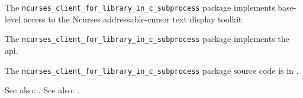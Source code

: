 
The {\tt ncurses\_client\_for\_library\_in\_c\_subprocess} package implements base-level access to the Ncurses addressable-cursor
text display toolkit.

The {\tt ncurses\_client\_for\_library\_in\_c\_subprocess} package implements the  api.

The {\tt ncurses\_client\_for\_library\_in\_c\_subprocess} package source code is in .

See also:  .
See also:  .


